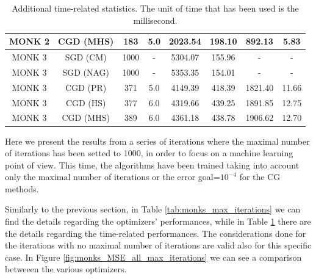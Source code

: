 \begin{table}[H]
\begin{subtable}{\textwidth}
{\begin{tabular}{| c | c | c | c | c | c | c | c |}
                             \hline
                             MONK 2 &  CGD (MHS) &               183 &            5.0 &       2023.54 &   198.10 &   892.13 &      5.83 \\
                             \hline
                             \hline
                             MONK 3 &   SGD (CM) &              1000 &              - &       5304.07 &   155.96 &        - &         - \\
                             \hline
                             MONK 3 &  SGD (NAG) &              1000 &              - &       5353.35 &   154.01 &        - &         - \\
                             \hline
                             \rowcolor[gray]{.9}
                             MONK 3 &   CGD (PR) &               371 &            5.0 &       4149.39 &   418.39 &  1821.40 &     11.66 \\
                             \hline
                             MONK 3 &   CGD (HS) &               377 &            6.0 &       4319.66 &   439.25 &  1891.85 &     12.75 \\
                             \hline
                             MONK 3 &  CGD (MHS) &               389 &            6.0 &       4361.18 &   438.78 &  1906.62 &     12.70 \\
                            \hline
                            \end{tabular}
                    }
                \end{subtable}
                \caption{Additional time-related statistics. The unit of time that has been used is the
                millisecond.}
                \label{tab:monks_additional_max_iterations}
            \end{table}

            Here we present the results from a series of iterations where the maximal number of iterations has
            been setted to 1000, in order to focus on a machine learning point of view. This time, the algorithms have been trained taking into account only the maximal number of iterations or the error goal=$10^{-4}$ for the CG methods.

            Similarly to the previous section, in Table \ref{tab:monks_max_iterations} we
            can find the details regarding the optimizers' performances, while in Table
            \ref{tab:monks_additional_max_iterations} there are the details regarding the time-related
            performances. The considerations done for the iterations with no maximal number of iterations are
            valid also for this specific case. In Figure \ref{fig:monks_MSE_all_max_iterations} we can see a
            comparison betweeen the various optimizers.

